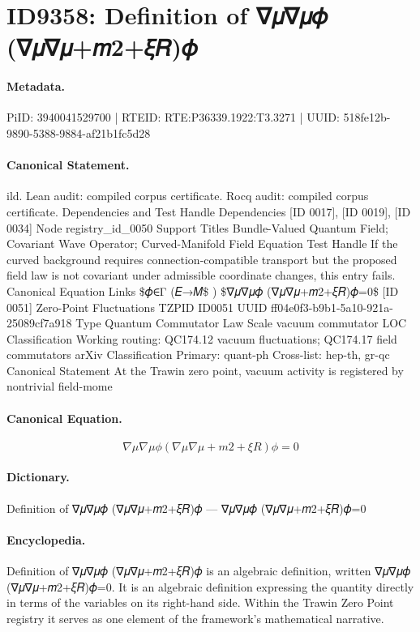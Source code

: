 \section*{ID9358: Definition of ∇𝜇∇𝜇𝜙 (∇𝜇∇𝜇+𝑚2+𝜉𝑅)𝜙}
\paragraph{Metadata.}
PiID: 3940041529700 | RTEID: RTE:P36339.1922:T3.3271 | UUID: 518fe12b-9890-5388-9884-af21b1fc5d28

\paragraph{Canonical Statement.}
ild. Lean audit: compiled corpus certificate. Rocq audit: compiled corpus certificate. Dependencies and Test Handle Dependencies [ID 0017], [ID 0019], [ID 0034] Node registry\_id\_0050 Support Titles Bundle-Valued Quantum Field; Covariant Wave Operator; Curved-Manifold Field Equation Test Handle If the curved background requires connection-compatible transport but the proposed field law is not covariant under admissible coordinate changes, this entry fails. Canonical Equation Links \$𝜙∈Γ (𝐸→𝑀\$ ) \$∇𝜇∇𝜇𝜙 (∇𝜇∇𝜇+𝑚2+𝜉𝑅)𝜙=0\$ [ID 0051] Zero-Point Fluctuations TZPID ID0051 UUID ff04e0f3-b9b1-5a10-921a-25089cf7a918 Type Quantum Commutator Law Scale vacuum commutator LOC Classification Working routing: QC174.12 vacuum fluctuations; QC174.17 field commutators arXiv Classification Primary: quant-ph Cross-list: hep-th, gr-qc Canonical Statement At the Trawin zero point, vacuum activity is registered by nontrivial field-mome

\paragraph{Canonical Equation.}
\[
∇𝜇∇𝜇𝜙 (∇𝜇∇𝜇+𝑚2+𝜉𝑅)𝜙=0
\]

\paragraph{Dictionary.}
Definition of ∇𝜇∇𝜇𝜙 (∇𝜇∇𝜇+𝑚2+𝜉𝑅)𝜙 — ∇𝜇∇𝜇𝜙 (∇𝜇∇𝜇+𝑚2+𝜉𝑅)𝜙=0

\paragraph{Encyclopedia.}
Definition of ∇𝜇∇𝜇𝜙 (∇𝜇∇𝜇+𝑚2+𝜉𝑅)𝜙 is an algebraic definition, written ∇𝜇∇𝜇𝜙 (∇𝜇∇𝜇+𝑚2+𝜉𝑅)𝜙=0. It is an algebraic definition expressing the quantity directly in terms of the variables on its right-hand side. Within the Trawin Zero Point registry it serves as one element of the framework's mathematical narrative.
